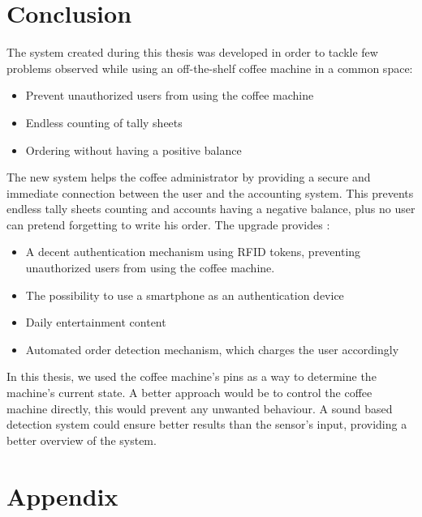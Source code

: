 \documentclass[12pt]{article}
\begin{document}
  \section{Conclusion}
  The system created during this thesis was developed in order to tackle few problems observed while using an off-the-shelf coffee machine in a common space:
  \begin{itemize}
   \item Prevent unauthorized users from using the coffee machine
   \item Endless counting of tally sheets
   \item Ordering without having a positive balance
  \end{itemize}
  The new system helps the coffee administrator by providing a secure and immediate connection between the user and the accounting system.
  This prevents endless tally sheets counting and accounts having a negative balance, plus no user can pretend forgetting to write his order. 
  The upgrade provides :
  \begin{itemize}
   \item A decent authentication mechanism using RFID tokens, preventing unauthorized users from using the coffee machine.
   \item The possibility to use a smartphone as an authentication device
   \item Daily entertainment content
   \item Automated order detection mechanism, which charges the user accordingly
  \end{itemize}
  
  In this thesis, we used the coffee machine's pins as a way to determine the machine's current state.
  A better approach would be to control the coffee machine directly, this would prevent any unwanted behaviour. 
  A sound based detection system could ensure better results than the sensor's input, providing a better overview of the system.
  \pagebreak
   \clearpage
\begingroup
  \pagestyle{empty}
  \null
  \newpage
\endgroup
  
  
  
  
    \pagebreak
   \clearpage
\begingroup
  \pagestyle{empty}
  \null
  \newpage
\endgroup
  
  \appendix
  \section{Appendix}
\end{document}
